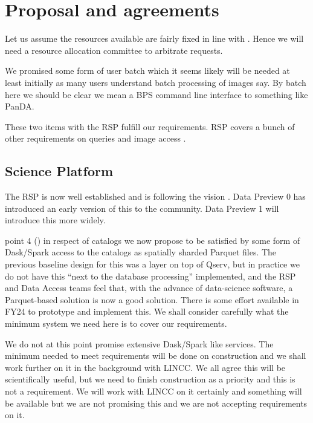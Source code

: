 \section{Proposal and agreements} \label{sec:proposal}

Let us assume the resources available are fairly fixed in line with .
Hence we will need a resource allocation  committee  to arbitrate requests.

We promised some form of user batch which it seems likely will be needed at least initially as many users understand batch processing of images say. By batch here we should be clear we mean a BPS command line interface to something like PanDA. 

These two items with the RSP fulfill our requirements.  RSP covers a bunch of other requirements on queries and image access .


\subsection{Science Platform}\label{sec:rsp}
The RSP is now well established and is following the vision .
Data Preview 0 has introduced an early version of this to the community.
Data Preview 1 will introduce this more widely.

 point 4 () in respect of catalogs we now propose to be satisfied by some form of Dask/Spark access to the catalogs as spatially sharded Parquet files.
The previous baseline design for this was a layer on top of Qserv, but in practice we do not have this ``next to the database processing'' implemented, and the RSP and Data Access teams feel that, with the advance of data-science software, a Parquet-based solution is now a good solution.
There is some effort available in FY24 to prototype and implement this.
We shall consider carefully what the minimum system we need here is to cover our requirements.

We do not at this point promise extensive Dask/Spark like services.
The minimum needed to meet requirements will be done on construction and we shall  work further  on it in the background with LINCC.
We all agree this will be scientifically useful, but we need to finish construction as a priority and this is not a requirement. We will work with LINCC on it certainly and something will be available but we are not promising this and we are not accepting requirements on it.

